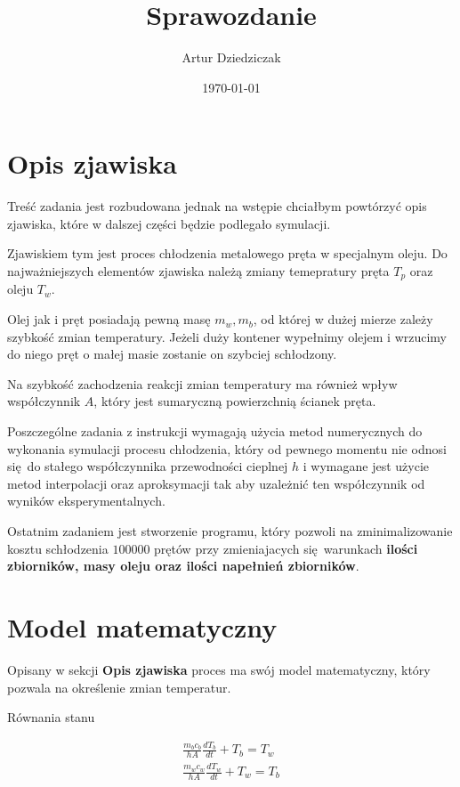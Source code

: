 \documentclass[varwidth,12pt,a4paper]{article}
\title{Sprawozdanie}
\author{Artur Dziedziczak}
\date{\today}
\begin{document}
\maketitle

\section{Opis zjawiska}

Treść zadania jest rozbudowana jednak na wstępie chciałbym powtórzyć opis zjawiska, które w dalszej części będzie podlegało symulacji.

Zjawiskiem tym jest proces chłodzenia metalowego pręta w specjalnym oleju. Do najważniejszych elementów zjawiska należą zmiany temepratury
pręta $T_p$ oraz oleju $T_w$.

Olej jak i pręt posiadają pewną masę $m_w, m_b$, od której w dużej mierze zależy szybkość zmian temperatury. Jeżeli 
duży kontener wypełnimy olejem i wrzucimy do niego pręt o małej masie zostanie on szybciej schłodzony.

Na szybkość zachodzenia reakcji zmian temperatury ma również wpływ współczynnik $A$, który jest sumaryczną powierzchnią
ścianek pręta.

Poszczególne zadania z instrukcji wymagają użycia metod numerycznych do wykonania symulacji procesu chłodzenia, który
od pewnego momentu nie odnosi się do stałego współczynnika przewodności cieplnej $h$ i wymagane jest użycie metod
interpolacji oraz aproksymacji tak aby uzależnić ten współczynnik od wyników eksperymentalnych.

Ostatnim zadaniem jest stworzenie programu, który pozwoli na zminimalizowanie kosztu schłodzenia $100000$ prętów
przy zmieniajacych się warunkach \textbf{ilości zbiorników, masy oleju oraz ilości napełnień zbiorników}.

\section{Model matematyczny}

Opisany w sekcji \textbf{Opis zjawiska} proces ma swój model matematyczny, który pozwala na określenie zmian temperatur.
\newline

Równania stanu

\begin{align}
    \frac{m_b c_b}{hA} \frac{dT_b}{dt} + T_b = T_w  \\
    \frac{m_w c_w}{hA} \frac{dT_w}{dt} + T_w = T_b  \nonumber
\end{align}
\end{document}
